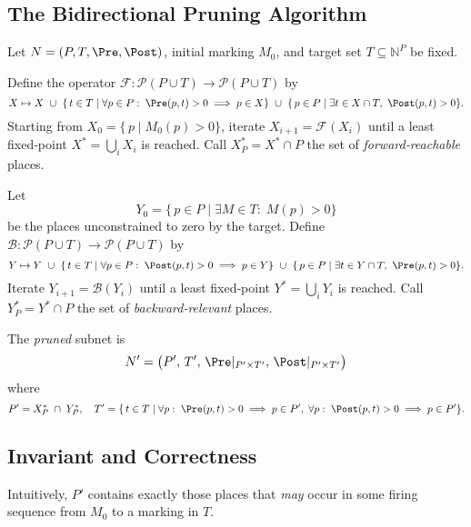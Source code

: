 	\subsection{The Bidirectional Pruning Algorithm}
	
	Let $N=(P,T,\Pre,\Post)$, initial marking $M_0$, and target set
	$T\subseteq\mathbb{N}^P$ be fixed.
	
	\begin{definition}
		Define the operator $\mathcal{F}:\mathcal{P}(P\cup T)\to\mathcal{P}(P\cup T)$ by
		\[
		X \mapsto X
		~\cup~
		\{\,t\in T \mid \forall p\in P:\; \Pre(p,t)>0 \implies p\in X\}
		~\cup~
		\{\,p\in P \mid \exists t\in X\cap T,\ \Post(p,t)>0\}.
		\]
		Starting from $X_0 = \{\,p\mid M_0(p)>0\}$, iterate
		$X_{i+1} = \mathcal{F}(X_i)$ until a least fixed‐point
		$X^*=\bigcup_i X_i$ is reached.  Call $X^*_P = X^*\cap P$ the set of
		\emph{forward‐reachable} places.
	\end{definition}
	
	\begin{definition}
		Let
		\[
		Y_0 = \{\,p\in P \mid \exists M\in T:\;M(p)>0\}
		\]
		be the places unconstrained to zero by the target.  Define
		$\mathcal{B}:\mathcal{P}(P\cup T)\to\mathcal{P}(P\cup T)$ by
		\[
		Y \mapsto Y
		~\cup~
		\{\,t\in T \mid \forall p\in P:\; \Post(p,t)>0 \implies p\in Y\}
		~\cup~
		\{\,p\in P \mid \exists t\in Y\cap T,\ \Pre(p,t)>0\}.
		\]
		Iterate $Y_{i+1} = \mathcal{B}(Y_i)$ until a least fixed‐point
		$Y^*=\bigcup_i Y_i$ is reached.  Call $Y^*_P = Y^*\cap P$ the set of
		\emph{backward‐relevant} places.
	\end{definition}
	
	\begin{definition}
		The \emph{pruned} subnet is
		\[
		N' = \bigl(P',\,T',\,\Pre|_{P'\times T'},\,\Post|_{P'\times T'}\bigr)
		\]
		where
		\[
		P' = X^*_P \;\cap\; Y^*_P,
		\quad
		T' = \{\,t\in T \mid
		\forall p:\;\Pre(p,t)>0\implies p\in P',\;
		\forall p:\;\Post(p,t)>0\implies p\in P'
		\}.
		\]
	\end{definition}
	
	\subsection{Invariant and Correctness}
	
	Intuitively, $P'$ contains exactly those places that
	\emph{may} occur in some firing sequence from $M_0$ to a marking in $T$.
	
